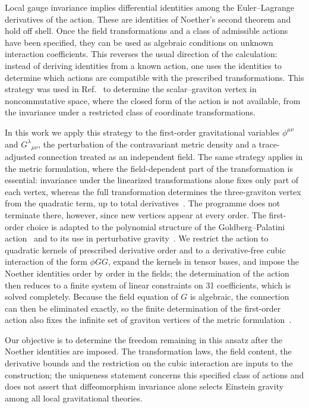 \documentclass[prd,aps,preprint,superscriptaddress,nofootinbib,amsmath,amssymb,eqsecnum]{revtex4-2}
\begin{document}
Local gauge invariance implies differential identities among the Euler--Lagrange derivatives
of the action. These are identities of Noether's second theorem and hold off shell. Once the
field transformations and a class of admissible actions have been specified, they can be used
as algebraic conditions on unknown interaction coefficients. This reverses the usual direction
of the calculation: instead of deriving identities from a known action, one uses the
identities to determine which actions are compatible with the prescribed transformations.
This strategy was used in Ref.~\cite{BrandtElias2006} to determine the scalar--graviton
vertex in noncommutative space, where the closed form of the action is not available, from
the invariance under a restricted class of coordinate transformations.

In this work we apply this strategy to the first-order gravitational variables $\phi^{\mu\nu}$
and $G^{\lambda}{}_{\mu\nu}$, the perturbation of the contravariant metric density and a
trace-adjusted connection treated as an independent field. The
same strategy applies in the metric formulation, where the field-dependent part of the
transformation is essential: invariance under the linearized transformations alone fixes
only part of each vertex, whereas the full transformation determines the three-graviton
vertex from the quadratic term, up to total derivatives~\cite{BrandtFrenkel1996}. The
programme does not terminate there, however, since new vertices appear at every order. The
first-order choice is adapted to the polynomial structure of the Goldberg--Palatini
action~\cite{Goldberg1958,Palatini1919,Ferraris1982} and to its use in perturbative
gravity~\cite{BrandtMcKeon2016}. We restrict the action to quadratic kernels of
prescribed derivative order and to a derivative-free cubic interaction of the form $\phi GG$,
expand the kernels in tensor bases, and impose the Noether identities order by order in the
fields; the determination of the action then reduces to a finite system of linear constraints on 31
coefficients, which is solved completely. Because the field equation of $G$ is algebraic, the
connection can then be eliminated exactly, so the finite determination of the first-order
action also fixes the infinite set of graviton vertices of the metric
formulation~\cite{BrandtMcKeon2016}.

Our objective is to determine the freedom remaining in this ansatz after the Noether
identities are imposed. The transformation laws, the field content, the derivative bounds and
the restriction on the cubic interaction are inputs to the construction; the
uniqueness statement concerns this specified class of actions and does not assert that
diffeomorphism invariance alone selects Einstein gravity among all local gravitational
theories.
\end{document}
